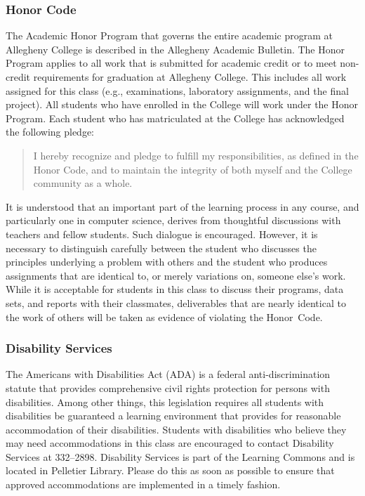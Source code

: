 \documentclass[11pt]{article}
\begin{document}
\subsubsection*{Honor Code}

The Academic Honor Program that governs the entire academic program at Allegheny
College is described in the Allegheny Academic Bulletin. The Honor Program
applies to all work that is submitted for academic credit or to meet non-credit
requirements for graduation at Allegheny College. This includes all work
assigned for this class (e.g., examinations, laboratory assignments, and the
final project). All students who have enrolled in the College will work under
the Honor Program. Each student who has matriculated at the College has
acknowledged the following pledge:

\vspace*{-.11in}
\begin{quote}
  I hereby recognize and pledge to fulfill my responsibilities, as defined in the Honor Code, and to maintain the
  integrity of both myself and the College community as a whole.
\end{quote}
\vspace*{-.11in}

\noindent It is understood that an important part of the learning process in any
course, and particularly one in computer science, derives from thoughtful
discussions with teachers and fellow students. Such dialogue is encouraged.
However, it is necessary to distinguish carefully between the student who
discusses the principles underlying a problem with others and the student who
produces assignments that are identical to, or merely variations on, someone
else's work. While it is acceptable for students in this class to discuss their
programs, data sets, and reports with their classmates, deliverables that are
nearly identical to the work of others will be taken as evidence of violating
the \mbox{Honor Code}.

\subsubsection*{Disability Services}

The Americans with Disabilities Act (ADA) is a federal anti-discrimination
statute that provides comprehensive civil rights protection for persons with
disabilities. Among other things, this legislation requires all students with
disabilities be guaranteed a learning environment that provides for reasonable
accommodation of their disabilities. Students with disabilities who believe they
may need accommodations in this class are encouraged to contact Disability
Services at 332--2898. Disability Services is part of the Learning Commons and
is located in Pelletier Library. Please do this as soon as possible to ensure
that approved accommodations are implemented in a timely fashion.
\end{document}
